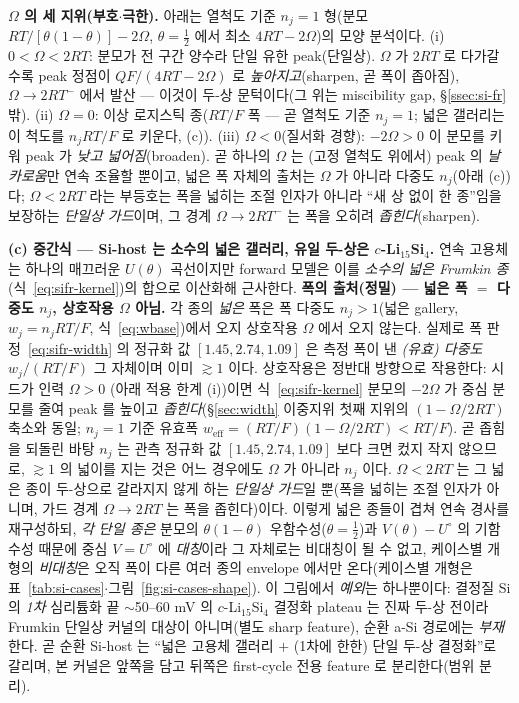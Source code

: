 \begin{signbox}
\textbf{$\Omega$ 의 세 지위(부호$\cdot$극한).} 아래는 열척도 기준 $n_j{=}1$ 형(분모 $RT/[\theta(1-\theta)]-2\Omega$,
$\theta{=}\tfrac12$ 에서 최소 $4RT-2\Omega$)의 모양 분석이다. (i) $0<\Omega<2RT$: 분모가 전 구간 양수라 단일 유한
peak(단일상). $\Omega$ 가 $2RT$ 로 다가갈수록 peak 정점이 $Q F/(4RT-2\Omega)$ 로 \emph{높아지고}(sharpen, 곧 폭이
좁아짐), $\Omega{\to}2RT^-$ 에서 발산 --- 이것이 두-상 문턱이다(그 위는 miscibility gap, \S\ref{ssec:si-fr} 밖). (ii)
$\Omega{=}0$: 이상 로지스틱 종($RT/F$ 폭 --- 곧 열척도 기준 $n_j{=}1$; 넓은 갤러리는 이 척도를 $n_jRT/F$ 로 키운다,
(c)). (iii) $\Omega<0$(질서화 경향): $-2\Omega>0$ 이 분모를 키워 peak 가 \emph{낮고 넓어짐}(broaden). 곧 하나의 $\Omega$
는 (고정 열척도 위에서) peak 의 \emph{날카로움}만 연속 조율할 뿐이고, 넓은 폭 자체의 출처는 $\Omega$ 가 아니라
다중도 $n_j$(아래 (c))다; $\Omega<2RT$ 라는 부등호는 폭을 넓히는 조절 인자가 아니라 ``새 상 없이 한 종''임을 보장하는
\emph{단일상 가드}이며, 그 경계 $\Omega{\to}2RT^-$ 는 폭을 오히려 \emph{좁힌다}(sharpen).
\end{signbox}

\textbf{(c) 중간식 --- Si-host 는 소수의 넓은 갤러리, 유일 두-상은 $c$-Li$_{15}$Si$_4$.} 연속 고용체는 하나의
매끄러운 $U(\theta)$ 곡선이지만 forward 모델은 이를 \emph{소수의 넓은 Frumkin 종}(식~\eqref{eq:sifr-kernel})의
합으로 이산화해 근사한다. \textbf{폭의 출처(정밀) --- 넓은 폭 $=$ 다중도 $n_j$, 상호작용 $\Omega$ 아님.} 각 종의
\emph{넓은} 폭은 폭 다중도 $n_j{>}1$(넓은 gallery, $w_j{=}n_jRT/F$, 식~\eqref{eq:wbase})에서 오지 상호작용 $\Omega$
에서 오지 않는다. 실제로 폭 판정~\eqref{eq:sifr-width} 의 정규화 값 $[1.45,2.74,1.09]$ 은 측정 폭이 낸 \emph{(유효)
다중도} $w_j/(RT/F)$ 그 자체이며 이미 $\gtrsim1$ 이다. 상호작용은 정반대 방향으로 작용한다: 시드가 인력 $\Omega{>}0$
(아래 적용 한계 (i))이면 식~\eqref{eq:sifr-kernel} 분모의 $-2\Omega$ 가 중심 분모를 줄여 peak 를 높이고
\emph{좁힌다}(\S\ref{sec:width} 이중지위 첫째 지위의 $(1-\Omega/2RT)$ 축소와 동일; $n_j{=}1$ 기준 유효폭
$w_\mathrm{eff}{=}(RT/F)(1-\Omega/2RT)<RT/F$). 곧 좁힘을 되돌린 바탕 $n_j$ 는 관측 정규화 값 $[1.45,2.74,1.09]$ 보다
크면 컸지 작지 않으므로, $\gtrsim1$ 의 넓이를 지는 것은 어느 경우에도 $\Omega$ 가 아니라 $n_j$ 이다. $\Omega<2RT$ 는
그 넓은 종이 두-상으로 갈라지지 않게 하는 \emph{단일상 가드}일 뿐(폭을 넓히는 조절 인자가 아니며, 가드 경계
$\Omega{\to}2RT$ 는 폭을 좁힌다)이다. 이렇게 넓은 종들이 겹쳐 연속 경사를 재구성하되, \emph{각 단일 종은} 분모의
$\theta(1-\theta)$ 우함수성($\theta{=}\tfrac12$)과 $V(\theta){-}U^\circ$ 의 기함수성 때문에 중심 $V{=}U^\circ$ 에
\emph{대칭}이라 그 자체로는 비대칭이 될 수 없고, 케이스별 개형의 \emph{비대칭}은 오직 폭이 다른 여러 종의 envelope
에서만 온다(케이스별 개형은 표~\ref{tab:si-cases}$\cdot$그림~\ref{fig:si-cases-shape}). 이 그림에서 \emph{예외}는
하나뿐이다: 결정질 Si 의 \emph{1차} 심리튬화 끝 $\sim$50--60 mV 의 $c$-Li$_{15}$Si$_4$ 결정화 plateau 는 진짜 두-상
전이라\cite{obrovac_christensen2004,ogata_nmr2014} Frumkin 단일상 커널의 대상이 아니며(별도 sharp feature), 순환
a-Si 경로에는 \emph{부재}한다\cite{chevrier_dahn2009}. 곧 순환 Si-host 는 ``넓은 고용체 갤러리 $+$ (1차에 한한)
단일 두-상 결정화''로 갈리며, 본 커널은 앞쪽을 담고 뒤쪽은 first-cycle 전용 feature 로 분리한다(범위 분리).

